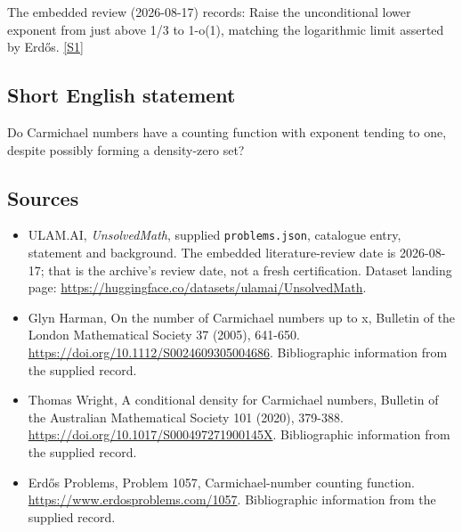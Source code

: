\documentclass[11pt,a4paper]{article}
\newcommand{\sref}[2]{\hyperlink{source:#1:#2}{[S#2]}}
\begin{document}
The embedded review (2026-08-17) records: Raise the unconditional lower exponent from just above 1/3 to 1-o(1), matching the logarithmic limit asserted by Erdős. \sref{statement}{1}

\subsection{Short English statement}

Do Carmichael numbers have a counting function with exponent tending to one, despite possibly forming a density-zero set?

\subsection{Sources}

{\small

\begin{itemize}

\item[\hypertarget{source:statement:1}{S1}] ULAM.AI, \emph{UnsolvedMath}, supplied \texttt{problems.json}, catalogue entry, statement and background. The embedded literature-review date is 2026-08-17; that is the archive’s review date, not a fresh certification. Dataset landing page: \url{https://huggingface.co/datasets/ulamai/UnsolvedMath}.

\item[\hypertarget{source:statement:2}{S2}] Glyn Harman, On the number of Carmichael numbers up to x, Bulletin of the London Mathematical Society 37 (2005), 641-650. \url{https://doi.org/10.1112/S0024609305004686}. Bibliographic information from the supplied record.

\item[\hypertarget{source:statement:3}{S3}] Thomas Wright, A conditional density for Carmichael numbers, Bulletin of the Australian Mathematical Society 101 (2020), 379-388. \url{https://doi.org/10.1017/S000497271900145X}. Bibliographic information from the supplied record.

\item[\hypertarget{source:statement:4}{S4}] Erdős Problems, Problem 1057, Carmichael-number counting function. \url{https://www.erdosproblems.com/1057}. Bibliographic information from the supplied record.

\end{itemize}

}

\label{end:statement}
\end{document}
